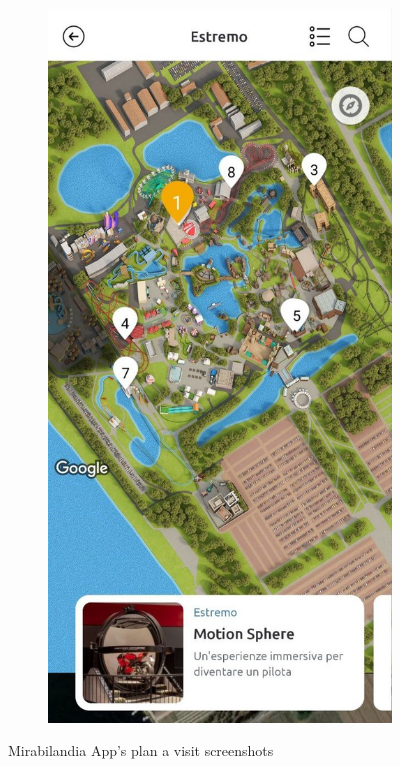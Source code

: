 \begin{figure}[H]
\begin{subfigure}[b]{0.35\textwidth}
	\end{subfigure}
	\begin{subfigure}[b]{0.35\textwidth}
		\centering
		\includegraphics[width=\textwidth]{img/miraextr}
	\end{subfigure}
	\caption{Mirabilandia App's plan a visit screenshots}
	\label{fig:miraApp}
\end{figure}

